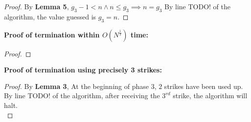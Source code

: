 \begin{problem}
\begin{proof}
  By \textbf{Lemma 5}, $g_3 - 1 < n \land n \leq g_3 \implies n = g_3$
  By line TODO! of the algorithm, the value guessed is $g_3 = n$.
  \end{proof}
  \textbf{Proof of termination within $O(N^{\frac{1}{3}})$ time:}
  \begin{proof}
  \end{proof}
  \textbf{Proof of termination using precisely 3 strikes:}
  \begin{proof}
    By \textbf{Lemma 3}, At the beginning of phase 3, $2$ strikes have been used up. \\
    By line TODO! of the algorithm, after receiving the $3^{rd}$ strike, the algorithm will halt. \\
  \end{proof}
\end{problem}

